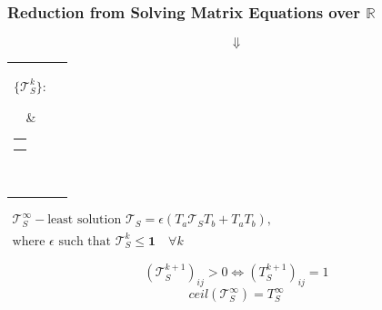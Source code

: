 \documentclass[aspectratio=169,xcolor=table]{beamer}
\begin{document}
\begin{frame}[fragile]
   
  \frametitle{Reduction from Solving Matrix Equations over $\mathbb{R}$}
  
    $$\Downarrow$$
    \centering
    \begin{tabular}{cl}
    \parbox{0.07\linewidth}{
    $\{ \mathcal{T}_S^k \}:$
    }
    & \begin{tabular}{l}
    $\mathcal{T}_S^0 = \mathbf{0}$ \\
    $\mathcal{T}_S^{k+1} = \epsilon(T_a \mathcal{T}_S^k T_b + T_a T_b)$
    \end{tabular} \\
    \end{tabular}

    \vspace{20pt}
    \(
    \left.
    \begin{array}{c}
    \mathcal{T}_S^{\infty} - \text{least solution } \mathcal{T}_S = \epsilon(T_a \mathcal{T}_S T_b + T_a T_b), \\
    \text{where } \epsilon \text{ such that } \mathcal{T}_{S}^{k} \leq \textbf{1} \quad \forall k
    \end{array}
    \right.
    \)
  
  \pause
  
  $$(\mathcal{T}_S^{k+1})_{ij} > 0 \iff (T_S^{k+1})_{ij} = 1$$
  $$ceil(\mathcal{T}_S^{\infty}) = T_S^{\infty}$$
\end{frame}
\end{document}
